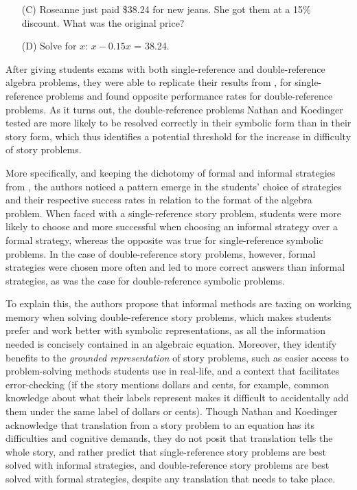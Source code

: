 \documentclass[10pt,letterpaper]{article}
\begin{document}
\begin{enumerate}
	\item[(C)] Roseanne just paid \$38.24 for new jeans. She got them at a 15\% discount. What was the original price?
	
	\item[(D)] Solve for $x$: $x - 0.15x$ = 38.24.
\end{enumerate}

After giving students exams with both single-reference and double-reference algebra problems, they were able to replicate their results from , for single-reference problems and found opposite performance rates for double-reference problems. As it turns out, the double-reference problems Nathan and Koedinger tested are more likely to be resolved correctly in their symbolic form than in their story form, which thus identifies a potential threshold for the increase in difficulty of story problems. 

More specifically, and keeping the dichotomy of formal and informal strategies from , the authors noticed a pattern emerge in the students' choice of strategies and their respective success rates in relation to the format of the algebra problem. When faced with a single-reference story problem, students were more likely to choose and more successful when choosing an informal strategy over a formal strategy, whereas the opposite was true for single-reference symbolic problems. In the case of double-reference story problems, however, formal strategies were chosen more often and led to more correct answers than informal strategies, as was the case for double-reference symbolic problems. 

To explain this, the authors propose that informal methods are taxing on working memory when solving double-reference story problems, which makes students prefer and work better with symbolic representations, as all the information needed is concisely contained in an algebraic equation. Moreover, they identify benefits to the \textit{grounded representation} of story problems, such as easier access to problem-solving methods students use in real-life, and a context that facilitates error-checking (if the story mentions dollars and cents, for example, common knowledge about what their labels represent makes it difficult to accidentally add them under the same label of dollars or cents). Though Nathan and Koedinger acknowledge that translation from a story problem to an equation has its difficulties and cognitive demands, they do not posit that translation tells the whole story, and rather predict that single-reference story problems are best solved with informal strategies, and double-reference story problems are best solved with formal strategies, despite any translation that needs to take place.
\end{document}
